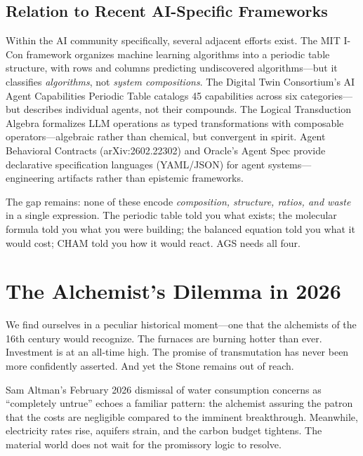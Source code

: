 \documentclass[12pt]{article}
\begin{document}
\subsection{Relation to Recent AI-Specific Frameworks}
\label{sec:aiframeworks}

Within the AI community specifically, several adjacent efforts exist. The MIT I-Con framework \citep{hamilton2025} organizes machine learning algorithms into a periodic table structure, with rows and columns predicting undiscovered algorithms---but it classifies \emph{algorithms}, not \emph{system compositions}. The Digital Twin Consortium's AI Agent Capabilities Periodic Table \citep{dtc2025} catalogs 45 capabilities across six categories---but describes individual agents, not their compounds. The Logical Transduction Algebra \citep{zhuge2026} formalizes LLM operations as typed transformations with composable operators---algebraic rather than chemical, but convergent in spirit. Agent Behavioral Contracts (arXiv:2602.22302) and Oracle's Agent Spec provide declarative specification languages (YAML/JSON) for agent systems---engineering artifacts rather than epistemic frameworks.

The gap remains: none of these encode \emph{composition, structure, ratios, and waste} in a single expression. The periodic table told you what exists; the molecular formula told you what you were building; the balanced equation told you what it would cost; CHAM told you how it would react. AGS needs all four.

\section{The Alchemist's Dilemma in 2026}
\label{sec:dilemma}

We find ourselves in a peculiar historical moment---one that the alchemists of the 16th century would recognize. The furnaces are burning hotter than ever. Investment is at an all-time high. The promise of transmutation has never been more confidently asserted. And yet the Stone remains out of reach.

Sam Altman's February 2026 dismissal of water consumption concerns as ``completely untrue'' echoes a familiar pattern: the alchemist assuring the patron that the costs are negligible compared to the imminent breakthrough. Meanwhile, electricity rates rise, aquifers strain, and the carbon budget tightens. The material world does not wait for the promissory logic to resolve.
\end{document}
